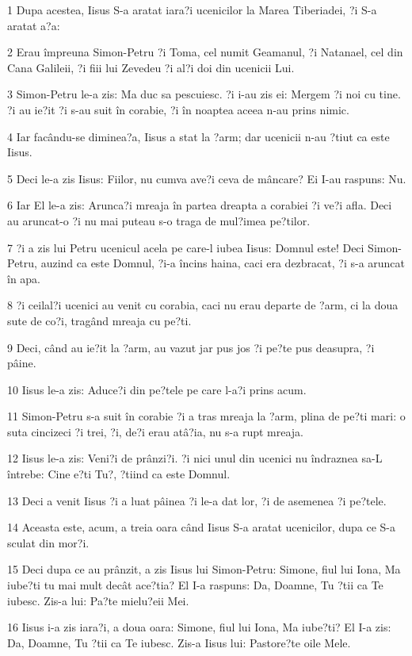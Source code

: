 \par 1 Dupa acestea, Iisus S-a aratat iara?i ucenicilor la Marea Tiberiadei, ?i S-a aratat a?a:
\par 2 Erau împreuna Simon-Petru ?i Toma, cel numit Geamanul, ?i Natanael, cel din Cana Galileii, ?i fiii lui Zevedeu ?i al?i doi din ucenicii Lui.
\par 3 Simon-Petru le-a zis: Ma duc sa pescuiesc. ?i i-au zis ei: Mergem ?i noi cu tine. ?i au ie?it ?i s-au suit în corabie, ?i în noaptea aceea n-au prins nimic.
\par 4 Iar facându-se diminea?a, Iisus a stat la ?arm; dar ucenicii n-au ?tiut ca este Iisus.
\par 5 Deci le-a zis Iisus: Fiilor, nu cumva ave?i ceva de mâncare? Ei I-au raspuns: Nu.
\par 6 Iar El le-a zis: Arunca?i mreaja în partea dreapta a corabiei ?i ve?i afla. Deci au aruncat-o ?i nu mai puteau s-o traga de mul?imea pe?tilor.
\par 7 ?i a zis lui Petru ucenicul acela pe care-l iubea Iisus: Domnul este! Deci Simon-Petru, auzind ca este Domnul, ?i-a încins haina, caci era dezbracat, ?i s-a aruncat în apa.
\par 8 ?i ceilal?i ucenici au venit cu corabia, caci nu erau departe de ?arm, ci la doua sute de co?i, tragând mreaja cu pe?ti.
\par 9 Deci, când au ie?it la ?arm, au vazut jar pus jos ?i pe?te pus deasupra, ?i pâine.
\par 10 Iisus le-a zis: Aduce?i din pe?tele pe care l-a?i prins acum.
\par 11 Simon-Petru s-a suit în corabie ?i a tras mreaja la ?arm, plina de pe?ti mari: o suta cincizeci ?i trei, ?i, de?i erau atâ?ia, nu s-a rupt mreaja.
\par 12 Iisus le-a zis: Veni?i de prânzi?i. ?i nici unul din ucenici nu îndraznea sa-L întrebe: Cine e?ti Tu?, ?tiind ca este Domnul.
\par 13 Deci a venit Iisus ?i a luat pâinea ?i le-a dat lor, ?i de asemenea ?i pe?tele.
\par 14 Aceasta este, acum, a treia oara când Iisus S-a aratat ucenicilor, dupa ce S-a sculat din mor?i.
\par 15 Deci dupa ce au prânzit, a zis Iisus lui Simon-Petru: Simone, fiul lui Iona, Ma iube?ti tu mai mult decât ace?tia? El I-a raspuns: Da, Doamne, Tu ?tii ca Te iubesc. Zis-a lui: Pa?te mielu?eii Mei.
\par 16 Iisus i-a zis iara?i, a doua oara: Simone, fiul lui Iona, Ma iube?ti? El I-a zis: Da, Doamne, Tu ?tii ca Te iubesc. Zis-a Iisus lui: Pastore?te oile Mele.
